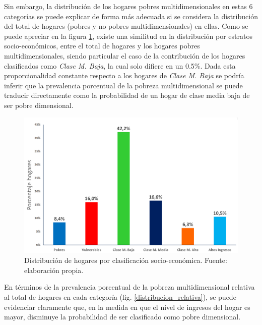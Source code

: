 \documentclass[12pt,letterpaper,spanish]{article}
\begin{document}
Sin embargo, la distribución de los hogares pobres multidimensionales en estas 6 categorías se puede explicar de forma más adecuada si se considera la distribución del total de hogares (pobres y no pobres multidimensionales) en ellas. Como se puede apreciar en la figura \ref{distribucion_socio}, existe una similitud en la distribución por estratos socio-económicos, entre el total de hogares y los hogares pobres multidimensionales, siendo particular el caso de la contribución de los hogares clasificados como \textit{Clase M. Baja}, la cual solo difiere en un 0.5\%. Dada esta proporcionalidad constante respecto a los hogares de \textit{Clase M. Baja} se podría inferir que la prevalencia porcentual de la pobreza multidimensional se puede traducir directamente como la probabilidad de un hogar de clase media baja de ser pobre dimensional.

\begin{figure}[!]
    \centering
    \includegraphics[height=8 cm]{Max/clasificacione_social_general.png}
    \caption{Distribución de hogares por clasificación socio-económica. Fuente: elaboración propia.}
    \label{distribucion_socio}
\end{figure}


En términos de la prevalencia porcentual de la pobreza multidimensional relativa al total de hogares en cada categoría (fig. \ref{distribucion_relativa}), se puede evidenciar claramente que, en la medida en que el nivel de ingresos del hogar es mayor, disminuye la probabilidad de ser clasificado como pobre dimensional. 
\end{document}
